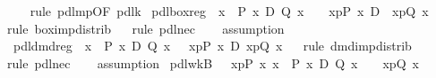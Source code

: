 \begin{isabellebody}
\ \ \isamarkupfalse%
\ {\isacharparenleft}rule\ pdl{\isacharunderscore}mp{\isacharbrackleft}OF\ pdl{\isacharunderscore}k{}{\isacharbrackright}{\isacharparenright}\isanewline
\isanewline
\isamarkupfalse%
\ pdl{\isacharunderscore}box{\isacharunderscore}reg{\isacharcolon}\ {\isachardoublequote}\ {\isasymforall}x{\isachardot}\ {\isasymturnstile}\ P\ x\ {\isasymlongrightarrow}\isactrlsub D\ Q\ x\ {\isasymLongrightarrow}\ {\isasymturnstile}\ {\isacharbrackleft}{\isacharhash}\ x{\isasymleftarrow}p{\isacharbrackright}{\isacharparenleft}P\ x{\isacharparenright}\ {\isasymlongrightarrow}\isactrlsub D\ {\isacharbrackleft}{\isacharhash}\ x{\isasymleftarrow}p{\isacharbrackright}{\isacharparenleft}Q\ x{\isacharparenright}{\isachardoublequote}\isanewline
\ \ \isamarkupfalse%
rule\ box{\isacharunderscore}imp{\isacharunderscore}distrib{\isacharparenright}\isanewline
\ \ \isamarkupfalse%
rule\ pdl{\isacharunderscore}nec{\isacharparenright}\isanewline
\ \ \isamarkupfalse%
\ assumption\isanewline
\isamarkupfalse%
\isanewline
\isanewline
\isamarkupfalse%
\ pdl{\isacharunderscore}dmd{\isacharunderscore}reg{\isacharcolon}\ {\isachardoublequote}\ {\isasymforall}x{\isachardot}\ {\isasymturnstile}\ P\ x\ {\isasymlongrightarrow}\isactrlsub D\ Q\ x\ {\isasymLongrightarrow}\ {\isasymturnstile}\ {\isasymlangle}x{\isasymleftarrow}p{\isasymrangle}{\isacharparenleft}P\ x{\isacharparenright}\ {\isasymlongrightarrow}\isactrlsub D\ {\isasymlangle}x{\isasymleftarrow}p{\isasymrangle}{\isacharparenleft}Q\ x{\isacharparenright}{\isachardoublequote}\isanewline
\ \ \isamarkupfalse%
rule\ dmd{\isacharunderscore}imp{\isacharunderscore}distrib{\isacharparenright}\isanewline
\ \ \isamarkupfalse%
rule\ pdl{\isacharunderscore}nec{\isacharparenright}\isanewline
\ \ \isamarkupfalse%
\ assumption\isanewline
\isamarkupfalse%
\isanewline
\isanewline
\isanewline
\isamarkupfalse%
\ pdl{\isacharunderscore}wkB{\isacharcolon}\ {\isachardoublequote}{\isasymlbrakk}{\isasymturnstile}\ {\isacharbrackleft}{\isacharhash}\ x{\isasymleftarrow}p{\isacharbrackright}{\isacharparenleft}P\ x{\isacharparenright}{\isacharsemicolon}\ {\isasymforall}x{\isachardot}\ {\isasymturnstile}\ P\ x\ {\isasymlongrightarrow}\isactrlsub D\ Q\ x{\isasymrbrakk}\ {\isasymLongrightarrow}\ {\isasymturnstile}\ {\isacharbrackleft}{\isacharhash}\ x{\isasymleftarrow}p{\isacharbrackright}{\isacharparenleft}Q\ x{\isacharparenright}{\isachardoublequote}\isanewline

\end{isabellebody}

